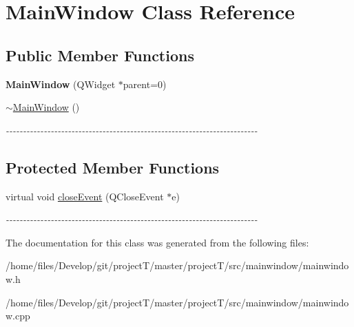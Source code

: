 \hypertarget{classMainWindow}{
\section{MainWindow Class Reference}
\label{classMainWindow}
}
\subsection*{Public Member Functions}
\begin{DoxyCompactItemize}
\item 
\hypertarget{classMainWindow_a8b244be8b7b7db1b08de2a2acb9409db}{
{\bfseries MainWindow} (QWidget $\ast$parent=0)}
\label{classMainWindow_a8b244be8b7b7db1b08de2a2acb9409db}

\item 
\hypertarget{classMainWindow_ae98d00a93bc118200eeef9f9bba1dba7}{
\hyperlink{classMainWindow_ae98d00a93bc118200eeef9f9bba1dba7}{$\sim$MainWindow} ()}
\label{classMainWindow_ae98d00a93bc118200eeef9f9bba1dba7}

\begin{DoxyCompactList}\small\item\em -\/-\/-\/-\/-\/-\/-\/-\/-\/-\/-\/-\/-\/-\/-\/-\/-\/-\/-\/-\/-\/-\/-\/-\/-\/-\/-\/-\/-\/-\/-\/-\/-\/-\/-\/-\/-\/-\/-\/-\/-\/-\/-\/-\/-\/-\/-\/-\/-\/-\/-\/-\/-\/-\/-\/-\/-\/-\/-\/-\/-\/-\/-\/-\/-\/-\/-\/-\/-\/-\/-\/-\/-\/ \item\end{DoxyCompactList}\end{DoxyCompactItemize}
\subsection*{Protected Member Functions}
\begin{DoxyCompactItemize}
\item 
\hypertarget{classMainWindow_a8a5bf36f9544ed3ec3a9eea9b7154564}{
virtual void \hyperlink{classMainWindow_a8a5bf36f9544ed3ec3a9eea9b7154564}{closeEvent} (QCloseEvent $\ast$e)}
\label{classMainWindow_a8a5bf36f9544ed3ec3a9eea9b7154564}

\begin{DoxyCompactList}\small\item\em -\/-\/-\/-\/-\/-\/-\/-\/-\/-\/-\/-\/-\/-\/-\/-\/-\/-\/-\/-\/-\/-\/-\/-\/-\/-\/-\/-\/-\/-\/-\/-\/-\/-\/-\/-\/-\/-\/-\/-\/-\/-\/-\/-\/-\/-\/-\/-\/-\/-\/-\/-\/-\/-\/-\/-\/-\/-\/-\/-\/-\/-\/-\/-\/-\/-\/-\/-\/-\/-\/-\/-\/-\/ \item\end{DoxyCompactList}\end{DoxyCompactItemize}


The documentation for this class was generated from the following files:\begin{DoxyCompactItemize}
\item 
/home/files/Develop/git/projectT/master/projectT/src/mainwindow/mainwindow.h\item 
/home/files/Develop/git/projectT/master/projectT/src/mainwindow/mainwindow.cpp\end{DoxyCompactItemize}
